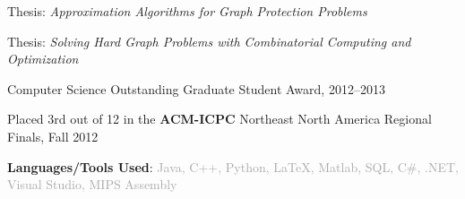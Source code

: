 \documentclass{article}
\begin{document}

\vspace*{-0.25em}

\begin{reslist}
  \item Thesis: \emph{Approximation Algorithms for Graph Protection Problems}
\end{reslist}

\vspace*{0.25em}

\begin{reslist}
  \item Thesis: \emph{Solving Hard Graph Problems with Combinatorial
    Computing and Optimization}
  \item Computer Science Outstanding Graduate Student Award, 2012--2013
  \item Placed 3rd out of 12 in the {\bf ACM-ICPC} Northeast North America Regional Finals, Fall 2012
\end{reslist}

\vspace*{0.25em}


\vspace*{0.25em}

\textbf{Languages/Tools Used}:
  \textcolor{darkgray}{
    Java, C++, Python, \LaTeX, {\sc Matlab}, SQL, C\#, .NET, Visual Studio, MIPS Assembly
  }






\end{document}
